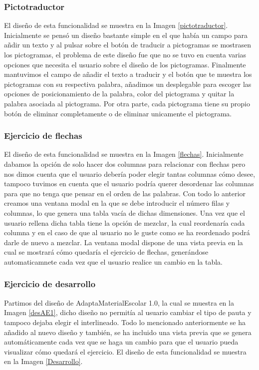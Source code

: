 \subsubsection{Pictotraductor}
El diseño de esta funcionalidad se muestra en la Imagen \ref{pictotraductor}. Inicialmente se pensó un diseño bastante simple en el que había un campo para añdir un texto y al pulsar sobre el botón de traducir a pictogramas se mostrasen los pictogramas, el problema de este diseño fue que no se tuvo en cuenta varias opciones que necesita el usuario sobre el diseño de los pictogramas. Finalmente mantuvimos el campo de añadir el texto a traducir y el botón que te muestra los pictogramas con su respectiva palabra, añadimos un desplegable para escoger las opciones de posicionamiento de la palabra, color del pictograma y quitar la palabra asociada al pictograma. Por otra parte, cada pictograma tiene su propio botón de eliminar completamente o de eliminar unicamente el pictograma. 

\subsubsection{Ejercicio de flechas}
El diseño de esta funcionalidad se muestra en la Imagen \ref{flechas}. Inicialmente dabamos la opción de solo hacer dos columnas para relacionar con flechas pero nos dimos cuenta que el usuario debería poder elegir tantas columnas cómo desee, tampoco tuvimos en cuenta que el usuario podría querer desordenar las columnas para que no tenga que pensar en el orden de las palabras. Con todo lo anterior creamos una ventana modal en la que se debe introducir el número filas y columnas, lo que genera una tabla vacía de dichas dimensiones. Una vez que el usuario rellena dicha tabla tiene la opción de mezclar, la cual reordenaría cada columna y en el caso de que al usuario no le guste como se ha reordenado podrá darle de nuevo a mezclar. La ventana modal dispone de una vista previa en la cual se mostrará cómo quedaría el ejercicio de flechas, generándose automaticamnete cada vez que el usuario realice un cambio en la tabla. 

\subsubsection{Ejercicio de desarrollo}
 Partimos del diseño de AdaptaMaterialEscolar 1.0, la cual se muestra en la Imagen \ref{desAE1}, dicho diseño no permitía al usuario cambiar el tipo de pauta y tampoco dejaba elegir el interlineado. Todo lo mencionado anteriormente se ha añadido al nuevo diseño y también, se ha incluido una vista previa que se genera automáticamente cada vez que se haga un cambio para que el usuario pueda visualizar cómo quedará el ejercicio. El diseño de esta funcionalidad se muestra en la Imagen \ref{Desarrollo}.    

